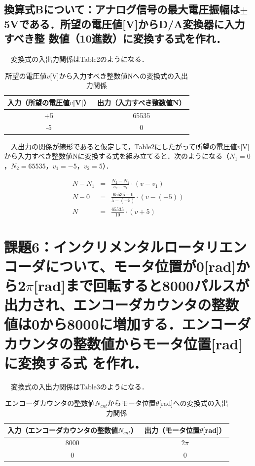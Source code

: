 \subsection{換算式Bについて：アナログ信号の最大電圧振幅は$\pm$5Vである．所望の電圧値[V]からD/A変換器に入力すべき整
数値（10進数）に変換する式を作れ．}
　変換式の入出力関係はTable2のようになる．
\begin{table}[hbtp]
    \caption{所望の電圧値$v$[V]から入力すべき整数値Nへの変換式の入出力関係}
    \centering
    \begin{tabular}{cc}
    \hline
    入力（所望の電圧値$v$[V]）  & 出力（入力すべき整数値N） \\
    \hline \hline
    +5 & 65535  \\
    -5 & 0 \\
    \hline
    \end{tabular}
\end{table}

　入出力の関係が線形であると仮定して，Table2にしたがって所望の電圧値$v$[V]から入力すべき整数値Nに変換する式を組み立てると．次のようになる（$N_1 = 0$，$N_2 = 65535$，$v_1 = -5$，$v_2 = 5$）．

\begin{eqnarray}
    N - N_1 &=& \frac{N_2 - N_1}{v_2 - v_1} \cdot \left(v - v_1 \right) \nonumber \\
    N - 0 &=& \frac{65535 - 0}{5 - (-5)} \cdot \left(v - (-5) \right) \nonumber \\
    N &=& \frac{65535}{10} \cdot \left(v + 5 \right)
\end{eqnarray}

\section{課題6：インクリメンタルロータリエンコーダについて、モータ位置が0[rad]から2$\pi$[rad]まで回転すると8000パルスが出力され、エンコーダカウンタの整数値は0から8000に増加する．エンコーダカウンタの整数値からモータ位置[rad]に変換する式
を作れ．}
　変換式の入出力関係はTable3のようになる．
\begin{table}[hbtp]
    \caption{エンコーダカウンタの整数値$N_{cnt}$からモータ位置$\theta$[rad]への変換式の入出力関係}
    \centering
    \begin{tabular}{cc}
    \hline
    入力（エンコーダカウンタの整数値$N_{cnt}$）  & 出力（モータ位置$\theta$[rad]） \\
    \hline \hline
    8000 & 2$\pi$  \\
    0 & 0 \\
    \hline
    \end{tabular}
\end{table}

